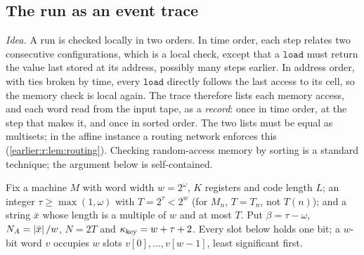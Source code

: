 \subsection{The run as an event trace}\label{earlier:r:app:event-trace}

\emph{Idea.} A run is checked locally in two orders. In time order,
each step relates two consecutive configurations, which is a local
check, except that a \(\mathtt{load}\) must return the value last stored
at its address, possibly many steps earlier. In address order, with
ties broken by time, every \(\mathtt{load}\) directly follows the last
access to its cell, so the memory check is local again. The trace
therefore lists each memory access, and each word read from the input
tape, as a \emph{record}: once in time order, at the step that makes
it, and once in sorted order. The two lists must be equal as multisets;
in the affine instance a routing network enforces this
(\cref{earlier:r:lem:routing}). Checking random-access memory by sorting is a
standard technique; the argument below is self-contained.

Fix a machine \(M\) with word width \(w=2^\omega\), \(K\) registers and
code length \(L\); an integer \(\tau\ge\max(1,\omega)\) with
\(T=2^\tau<2^w\) (for \(M_n\), \(T=T_n\), not \(T(n)\)); and a string \(\bar x\) whose length is a multiple of
\(w\) and at most \(T\). Put \(\beta=\tau-\omega\),
\(N_A=\left|\bar x\right|/w\), \(N=2T\) and \(\kappa_{\rm key}=w+\tau+2\). Every slot
below holds one bit; a \(w\)-bit word \(v\) occupies \(w\) slots
\(v[0],\ldots,v[w-1]\), least significant first.

